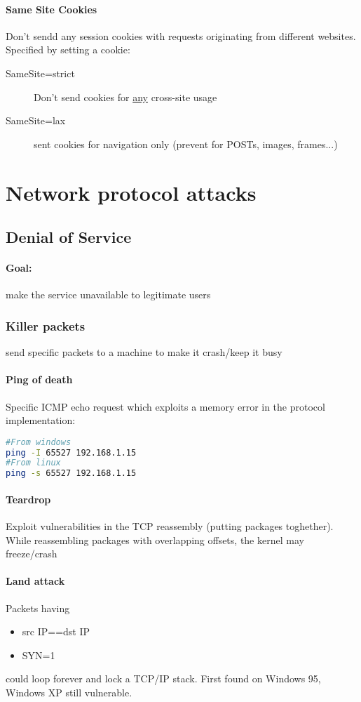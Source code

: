 \documentclass{article}
\begin{document}
\paragraph{Same Site Cookies}
Don't sendd any session cookies with requests originating from different websites. Specified by setting a cookie:
\begin{description}
\item[SameSite=strict] Don't send cookies for \underline{any} cross-site usage
\item[SameSite=lax] sent cookies for navigation only (prevent for POSTs, images, frames...)
\end{description}

\section{Network protocol attacks}
\subsection{Denial of Service} 
\paragraph{Goal:} make the service unavailable to legitimate users
\subsubsection{Killer packets} send specific packets to a machine to make it crash/keep it busy
\paragraph{Ping of death} Specific ICMP echo request which exploits a memory error in the protocol implementation:
\begin{lstlisting}[language=bash]
#From windows
ping -I 65527 192.168.1.15
#From linux
ping -s 65527 192.168.1.15
\end{lstlisting}
\paragraph{Teardrop}
Exploit vulnerabilities in the TCP reassembly (putting packages toghether). While reassembling packages with overlapping offsets, the kernel may freeze/crash
\paragraph{Land attack} Packets having
\begin{itemize}
\item src IP==dst IP
\item SYN=1
\end{itemize}
could loop forever and lock a TCP/IP stack. First found on Windows 95, Windows XP still vulnerable. 
\end{document}
